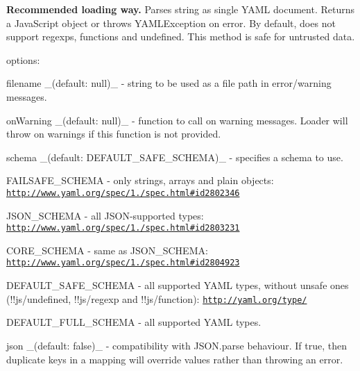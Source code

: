 {\bfseries Recommended loading way.} Parses {\ttfamily string} as single Y\+A\+ML document. Returns a Java\+Script object or throws {\ttfamily Y\+A\+M\+L\+Exception} on error. By default, does not support regexps, functions and undefined. This method is safe for untrusted data.

options\+:


\begin{DoxyItemize}
\item {\ttfamily filename} \+\_\+(default\+: null)\+\_\+ -\/ string to be used as a file path in error/warning messages.
\item {\ttfamily on\+Warning} \+\_\+(default\+: null)\+\_\+ -\/ function to call on warning messages. Loader will throw on warnings if this function is not provided.
\item {\ttfamily schema} \+\_\+(default\+: {\ttfamily D\+E\+F\+A\+U\+L\+T\+\_\+\+S\+A\+F\+E\+\_\+\+S\+C\+H\+E\+MA})\+\_\+ -\/ specifies a schema to use.
\begin{DoxyItemize}
\item {\ttfamily F\+A\+I\+L\+S\+A\+F\+E\+\_\+\+S\+C\+H\+E\+MA} -\/ only strings, arrays and plain objects\+: \href{http://www.yaml.org/spec/1.2/spec.html#id2802346}{\tt http\+://www.\+yaml.\+org/spec/1./spec.\+html\#id2802346}
\item {\ttfamily J\+S\+O\+N\+\_\+\+S\+C\+H\+E\+MA} -\/ all J\+S\+O\+N-\/supported types\+: \href{http://www.yaml.org/spec/1.2/spec.html#id2803231}{\tt http\+://www.\+yaml.\+org/spec/1./spec.\+html\#id2803231}
\item {\ttfamily C\+O\+R\+E\+\_\+\+S\+C\+H\+E\+MA} -\/ same as {\ttfamily J\+S\+O\+N\+\_\+\+S\+C\+H\+E\+MA}\+: \href{http://www.yaml.org/spec/1.2/spec.html#id2804923}{\tt http\+://www.\+yaml.\+org/spec/1./spec.\+html\#id2804923}
\item {\ttfamily D\+E\+F\+A\+U\+L\+T\+\_\+\+S\+A\+F\+E\+\_\+\+S\+C\+H\+E\+MA} -\/ all supported Y\+A\+ML types, without unsafe ones ({\ttfamily !!js/undefined}, {\ttfamily !!js/regexp} and {\ttfamily !!js/function})\+: \href{http://yaml.org/type/}{\tt http\+://yaml.\+org/type/}
\item {\ttfamily D\+E\+F\+A\+U\+L\+T\+\_\+\+F\+U\+L\+L\+\_\+\+S\+C\+H\+E\+MA} -\/ all supported Y\+A\+ML types.
\end{DoxyItemize}
\item {\ttfamily json} \+\_\+(default\+: false)\+\_\+ -\/ compatibility with J\+S\+O\+N.\+parse behaviour. If true, then duplicate keys in a mapping will override values rather than throwing an error.
\end{DoxyItemize}

